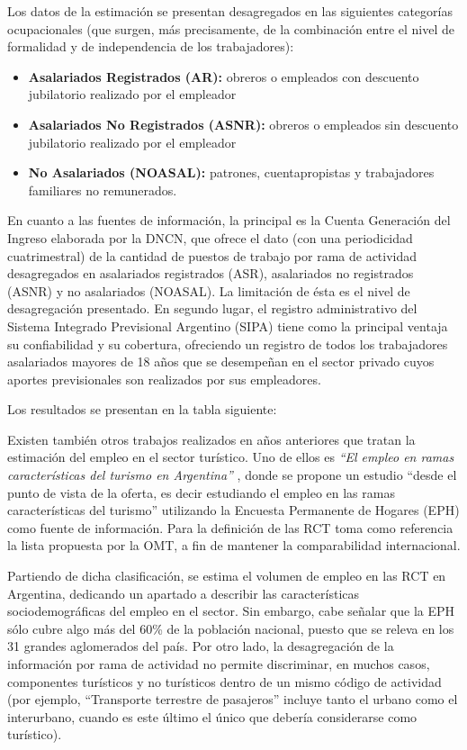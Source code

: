 \documentclass[
  openany]{book}
\providecommand{\tightlist}{%
  \setlength{\itemsep}{0pt}\setlength{\parskip}{0pt}}
\begin{document}
Los datos de la estimación se presentan desagregados en las siguientes categorías ocupacionales (que surgen, más precisamente, de la combinación entre el nivel de formalidad y de independencia de los trabajadores):

\begin{itemize}
\tightlist
\item
  \textbf{Asalariados Registrados (AR):} obreros o empleados con descuento jubilatorio realizado por el empleador
\item
  \textbf{Asalariados No Registrados (ASNR):} obreros o empleados sin descuento jubilatorio realizado por el empleador
\item
  \textbf{No Asalariados (NOASAL):} patrones, cuentapropistas y trabajadores familiares no remunerados.
\end{itemize}

En cuanto a las fuentes de información, la principal es la Cuenta Generación del Ingreso elaborada por la DNCN, que ofrece el dato (con una periodicidad cuatrimestral) de la cantidad de puestos de trabajo por rama de actividad desagregados en asalariados registrados (ASR), asalariados no registrados (ASNR) y no asalariados (NOASAL). La limitación de ésta es el nivel de desagregación presentado. En segundo lugar, el registro administrativo del Sistema Integrado Previsional Argentino (SIPA) tiene como la principal ventaja su confiabilidad y su cobertura, ofreciendo un registro de todos los trabajadores asalariados mayores de 18 años que se desempeñan en el sector privado cuyos aportes previsionales son realizados por sus empleadores.

Los resultados se presentan en la tabla siguiente:

Existen también otros trabajos realizados en años anteriores que tratan la estimación del empleo en el sector turístico. Uno de ellos es \emph{``El empleo en ramas características del turismo en Argentina''} \citep{mintur2007}, donde se propone un estudio ``desde el punto de vista de la oferta, es decir estudiando el empleo en las ramas características del turismo'' utilizando la Encuesta Permanente de Hogares (EPH) como fuente de información. Para la definición de las RCT toma como referencia la lista propuesta por la OMT, a fin de mantener la comparabilidad internacional.

Partiendo de dicha clasificación, se estima el volumen de empleo en las RCT en Argentina, dedicando un apartado a describir las características sociodemográficas del empleo en el sector. Sin embargo, cabe señalar que la EPH sólo cubre algo más del 60\% de la población nacional, puesto que se releva en los 31 grandes aglomerados del país. Por otro lado, la desagregación de la información por rama de actividad no permite discriminar, en muchos casos, componentes turísticos y no turísticos dentro de un mismo código de actividad (por ejemplo, ``Transporte terrestre de pasajeros'' incluye tanto el urbano como el interurbano, cuando es este último el único que debería considerarse como turístico).
\end{document}
